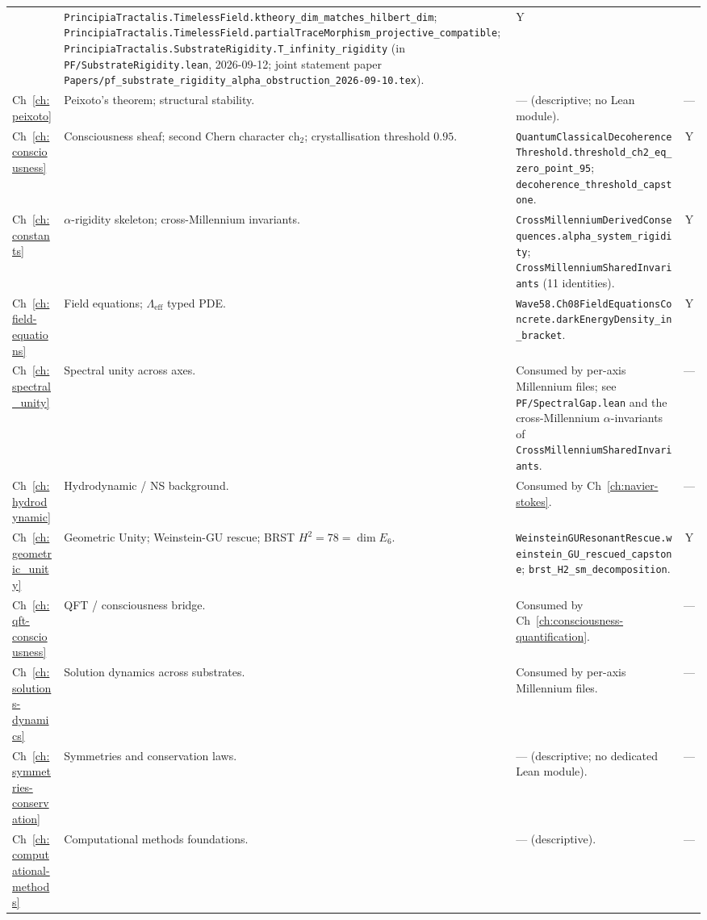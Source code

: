 \begin{table}[h]
\begin{tabular}{p{1.7cm}p{4.2cm}p{5.6cm}c}
& \texttt{PrincipiaTractalis.TimelessField.ktheory\_dim\_matches\_hilbert\_dim}; \texttt{PrincipiaTractalis.TimelessField.partialTraceMorphism\_projective\_compatible}; \texttt{PrincipiaTractalis.SubstrateRigidity.T\_infinity\_rigidity} (in \texttt{PF/SubstrateRigidity.lean}, 2026-09-12; joint statement paper \texttt{Papers/pf\_substrate\_rigidity\_alpha\_obstruction\_2026-09-10.tex}).
& Y \\
Ch~\ref{ch:peixoto}
& Peixoto's theorem; structural stability.
& --- (descriptive; no Lean module).
& --- \\
Ch~\ref{ch:consciousness}
& Consciousness sheaf; second Chern character $\text{ch}_2$; crystallisation threshold $0.95$.
& \texttt{QuantumClassicalDecoherenceThreshold.threshold\_ch2\_eq\_zero\_point\_95}; \texttt{decoherence\_threshold\_capstone}.
& Y \\
Ch~\ref{ch:constants}
& $\alpha$-rigidity skeleton; cross-Millennium invariants.
& \texttt{CrossMillenniumDerivedConsequences.alpha\_system\_rigidity}; \texttt{CrossMillenniumSharedInvariants} (11 identities).
& Y \\
Ch~\ref{ch:field-equations}
& Field equations; $\Lambda_{\text{eff}}$ typed PDE.
& \texttt{Wave58.Ch08FieldEquationsConcrete.darkEnergyDensity\_in\_bracket}.
& Y \\
Ch~\ref{ch:spectral_unity}
& Spectral unity across axes.
& Consumed by per-axis Millennium files; see \texttt{PF/SpectralGap.lean} and the cross-Millennium $\alpha$-invariants of \texttt{CrossMillenniumSharedInvariants}.
& --- \\
Ch~\ref{ch:hydrodynamic}
& Hydrodynamic / NS background.
& Consumed by Ch~\ref{ch:navier-stokes}.
& --- \\
Ch~\ref{ch:geometric_unity}
& Geometric Unity; Weinstein-GU rescue; BRST $H^2 = 78 = \dim E_6$.
& \texttt{WeinsteinGUResonantRescue.weinstein\_GU\_rescued\_capstone}; \texttt{brst\_H2\_sm\_decomposition}.
& Y \\
Ch~\ref{ch:qft-consciousness}
& QFT / consciousness bridge.
& Consumed by Ch~\ref{ch:consciousness-quantification}.
& --- \\
Ch~\ref{ch:solutions-dynamics}
& Solution dynamics across substrates.
& Consumed by per-axis Millennium files.
& --- \\
Ch~\ref{ch:symmetries-conservation}
& Symmetries and conservation laws.
& --- (descriptive; no dedicated Lean module).
& --- \\
Ch~\ref{ch:computational-methods}
& Computational methods foundations.
& --- (descriptive).
& --- \\

\end{tabular}
\end{table}
